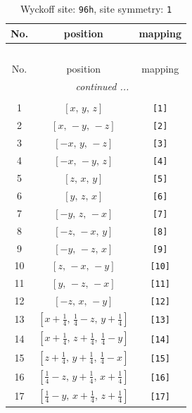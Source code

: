 \documentclass[fleqn,8pt]{jsarticle}
\begin{document}
\begin{longtable}{ccc}
\caption{Wyckoff site: {\tt 96h}, site symmetry: {\tt 1}}
 \\
 \hline \hline
No. & position & mapping \\ \hline \endfirsthead

\multicolumn{2}{l}{\tablename\ \thetable{}} \\
 \hline \hline
No. & position & mapping \\ \hline \endhead

 \hline \hline
\multicolumn{2}{r}{\footnotesize\it continued ...} \\ \endfoot

 \hline \hline
\multicolumn{2}{r}{} \\ \endlastfoot

1 & $\left[ x,\, y,\, z \right]$ & {\tt [1]} \\ \hline
2 & $\left[ x,\, - y,\, - z \right]$ & {\tt [2]} \\ \hline
3 & $\left[ - x,\, y,\, - z \right]$ & {\tt [3]} \\ \hline
4 & $\left[ - x,\, - y,\, z \right]$ & {\tt [4]} \\ \hline
5 & $\left[ z,\, x,\, y \right]$ & {\tt [5]} \\ \hline
6 & $\left[ y,\, z,\, x \right]$ & {\tt [6]} \\ \hline
7 & $\left[ - y,\, z,\, - x \right]$ & {\tt [7]} \\ \hline
8 & $\left[ - z,\, - x,\, y \right]$ & {\tt [8]} \\ \hline
9 & $\left[ - y,\, - z,\, x \right]$ & {\tt [9]} \\ \hline
10 & $\left[ z,\, - x,\, - y \right]$ & {\tt [10]} \\ \hline
11 & $\left[ y,\, - z,\, - x \right]$ & {\tt [11]} \\ \hline
12 & $\left[ - z,\, x,\, - y \right]$ & {\tt [12]} \\ \hline
13 & $\left[ x + \frac{1}{4},\, \frac{1}{4} - z,\, y + \frac{1}{4} \right]$ & {\tt [13]} \\ \hline
14 & $\left[ x + \frac{1}{4},\, z + \frac{1}{4},\, \frac{1}{4} - y \right]$ & {\tt [14]} \\ \hline
15 & $\left[ z + \frac{1}{4},\, y + \frac{1}{4},\, \frac{1}{4} - x \right]$ & {\tt [15]} \\ \hline
16 & $\left[ \frac{1}{4} - z,\, y + \frac{1}{4},\, x + \frac{1}{4} \right]$ & {\tt [16]} \\ \hline
17 & $\left[ \frac{1}{4} - y,\, x + \frac{1}{4},\, z + \frac{1}{4} \right]$ & {\tt [17]} \\ \hline

\end{longtable}
\end{document}
